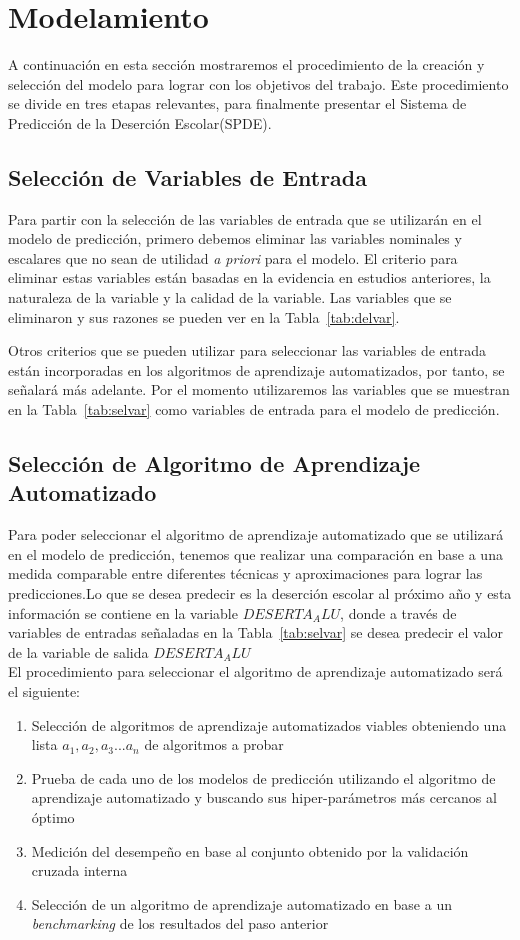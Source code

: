 \section{Modelamiento}
A continuación en esta sección mostraremos el procedimiento de la creación y selección del modelo para lograr con los objetivos del trabajo.
Este procedimiento se divide en tres etapas relevantes, para finalmente presentar el Sistema de Predicción de la Deserción Escolar(SPDE).
\subsection{Selección de Variables de Entrada}
Para partir con la selección de las variables de entrada que se utilizarán en el modelo de predicción, primero debemos eliminar las variables nominales y escalares que no sean de utilidad \textit{a priori} para el modelo.
El criterio para eliminar estas variables están basadas en la evidencia en estudios anteriores, la naturaleza de la variable y la calidad de la variable. Las variables que se eliminaron y sus razones se pueden ver en la Tabla~\ref{tab:delvar}.

Otros criterios que se pueden utilizar para seleccionar las variables de entrada están incorporadas en los algoritmos de aprendizaje automatizados, por tanto, se señalará más adelante. Por el momento utilizaremos las variables que se muestran en la Tabla~\ref{tab:selvar} como variables de entrada para el modelo de predicción.

\subsection{Selección de Algoritmo de Aprendizaje Automatizado}
Para poder seleccionar el algoritmo de aprendizaje automatizado que se utilizará en el modelo de predicción, tenemos que realizar una comparación en base a una medida comparable entre diferentes técnicas y aproximaciones para lograr las predicciones.Lo que se desea predecir es la deserción escolar al próximo año y esta información se contiene en la variable $DESERTA_ALU$, donde a través de variables de entradas señaladas en la Tabla~\ref{tab:selvar} se desea predecir el valor de la variable de salida $DESERTA_ALU$
\\El procedimiento para seleccionar el algoritmo de aprendizaje automatizado será el siguiente:
\begin{enumerate}
\item Selección de algoritmos de aprendizaje automatizados viables obteniendo una lista $a_1,a_2,a_3 ... a_n$ de algoritmos a probar
\item Prueba de cada uno de los modelos de predicción utilizando el algoritmo de aprendizaje automatizado y buscando sus hiper-parámetros más cercanos al óptimo
\item Medición del desempeño en base al conjunto obtenido por la validación cruzada interna
\item Selección de un algoritmo de aprendizaje automatizado en base a un \textit{benchmarking} de los resultados del paso anterior
\end{enumerate}
